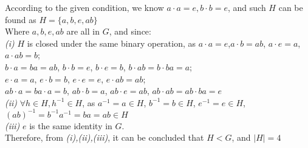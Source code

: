 \documentclass[11pt]{article}
\newcommand{\abs}[1]{\lvert #1 \rvert}
\newenvironment{problem}[2][Problem]{\begin{trivlist}
\item[\hskip \labelsep {\bfseries #1}\hskip \labelsep {\bfseries #2.}]}{\end{trivlist}}
\begin{document}
\begin{problem}{5}
According to the given condition, we know $a\cdot a = e, b\cdot b =e$, and such $H$ can be found as $H = \{ a, b, e, ab \}$\\
Where $a,b,e,ab$ are all in $G$, and since:\\
\textit{(i)} $H$ is closed under the same binary operation, as $a \cdot a = e$,$a\cdot b = ab$, $a \cdot e = a$, $a\cdot ab = b$;\\
$b\cdot a = ba = ab$, $b\cdot b = e$, $b\cdot e = b$, $b\cdot ab = b\cdot ba = a$;\\
$e \cdot a = a$, $e \cdot b = b$, $e \cdot e = e$, $e \cdot ab = ab$;\\
$ab \cdot a = ba \cdot a = b$, $ ab\cdot b = a$, $ab \cdot e = ab$, $ab\cdot ab = ab\cdot ba = e$\\
\textit{(ii)} $\forall h \in H, h^{-1} \in H$, as $a^{-1} = a \in H$, $b^{-1} = b \in H$, $e^{-1} =e \in H$, $(ab)^{-1} = b^{-1}a^{-1} = ba = ab \in H$\\
\textit{(iii)} $e$ is the same identity in $G$.\\
Therefore, from \textit{(i),(ii),(iii)}, it can be concluded that $H<G$, and $\abs{H}=4$\\
\end{problem}
\end{document}
